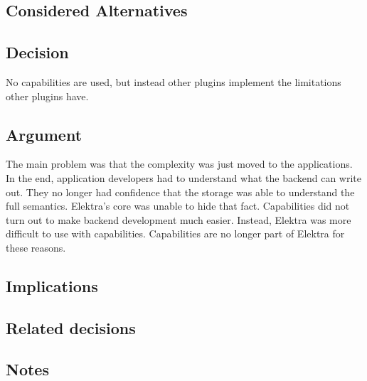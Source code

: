 \subsection*{Considered Alternatives}

\subsection*{Decision}

No capabilities are used, but instead other plugins implement the limitations other plugins have.

\subsection*{Argument}

The main problem was that the complexity was just moved to the applications. In the end, application developers had to understand what the backend can write out. They no longer had confidence that the storage was able to understand the full semantics. Elektra's core was unable to hide that fact. Capabilities did not turn out to make backend development much easier. Instead, Elektra was more difficult to use with capabilities. Capabilities are no longer part of Elektra for these reasons.

\subsection*{Implications}

\subsection*{Related decisions}

\subsection*{Notes}